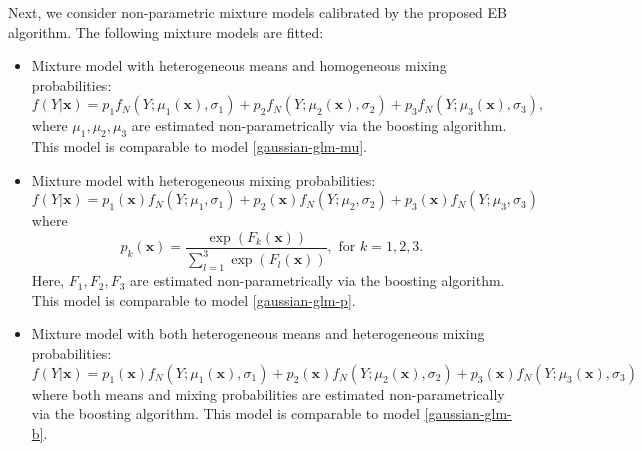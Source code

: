 \documentclass[11pt]{article}
\numberwithin{equation}{section}
\def\bx{\boldsymbol{x}}
\begin{document}
Next, we consider non-parametric mixture models calibrated by the proposed EB algorithm. The following mixture models are fitted:
\begin{itemize}
\item Mixture model with heterogeneous means and homogeneous mixing probabilities:
\begin{equation}\label{gaussian-bst-mu}
	f(Y|\bx)=p_1f_N(Y;\mu_1(\bx),\sigma_1)+p_2f_N(Y;\mu_2(\bx),\sigma_2)+p_3f_N(Y;\mu_3(\bx),\sigma_3),
\end{equation}
where $\mu_1,\mu_2,\mu_3$ are estimated non-parametrically via the boosting algorithm. This model is comparable to model \eqref{gaussian-glm-mu}.

\item Mixture model with heterogeneous mixing probabilities:
\begin{equation}\label{gaussian-bst-p}
	f(Y|\bx)=p_1(\bx)f_N(Y;\mu_1,\sigma_1)+p_2(\bx)f_N(Y;\mu_2,\sigma_2)+p_3(\bx)f_N(Y;\mu_3,\sigma_3)
\end{equation}
where
\begin{equation}\label{bst-p}
	p_k(\bx)=\frac{\exp\left(F_k(\bx)\right)}{\sum_{l=1}^{3}\exp\left(F_l(\bx)\right)}, \text{ for } k=1,2,3.
\end{equation}
Here, $F_1,F_2,F_3$ are estimated non-parametrically via the boosting algorithm. This model is comparable to model \eqref{gaussian-glm-p}.

\item Mixture model with both heterogeneous means and heterogeneous mixing probabilities:
\begin{equation}\label{gaussian-bst-b}
	f(Y|\bx)=p_1(\bx)f_N(Y;\mu_1(\bx),\sigma_1)+p_2(\bx)f_N(Y;\mu_2(\bx),\sigma_2)+p_3(\bx)f_N(Y;\mu_3(\bx),\sigma_3)
\end{equation}
where both means and mixing probabilities are estimated non-parametrically via the boosting algorithm. This model is comparable to model \eqref{gaussian-glm-b}.
\end{itemize}
\end{document}
